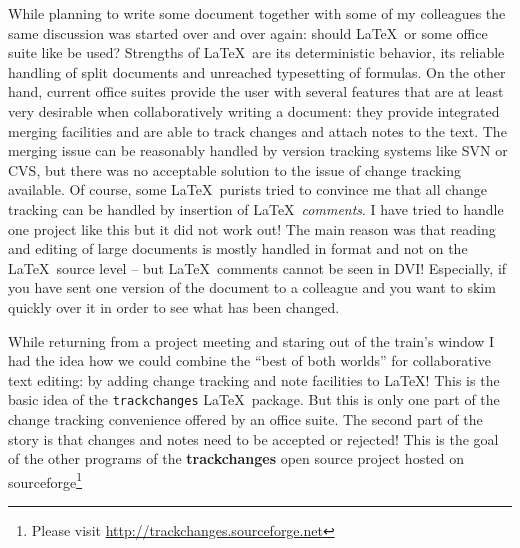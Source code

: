 \documentclass[a4paper,10pt]{article}
\begin{document}
While planning to write some  document together with some of my colleagues the same discussion was started over and over again: should \LaTeX\ or some office suite like  be used? Strengths of \LaTeX\ are its deterministic behavior, its reliable handling of split documents and unreached typesetting of formulas. On the other hand, current office suites provide the user with several features that are at least very desirable when collaboratively writing a document: they provide integrated merging facilities and are able to track changes and attach notes to the text. The merging issue can be reasonably handled by version tracking systems like SVN or CVS, but there was no acceptable solution to the issue of change tracking available. Of course, some  \LaTeX\ purists tried to convince me that all change tracking can be handled by insertion of \LaTeX\ \textit{comments}. I have tried to handle one project like this but it did not work out! The main reason was that reading and editing of large documents is mostly handled in  format and not on the \LaTeX\ source level -- but \LaTeX\ comments cannot be seen in DVI! Especially, if you have sent one version of the document to a colleague and you want to skim quickly over it in order to see what has been changed.

While returning from a project meeting and staring out of the train's window I had the idea how we could combine the ``best of both worlds'' for collaborative text editing: by adding change tracking and note facilities to \LaTeX ! This is the basic idea of the \texttt{trackchanges} \LaTeX\ package. But this is only one part of the change tracking convenience offered by an office suite. The second part of the story is that changes and notes need to be accepted or rejected! This is the goal of the other programs of the \textbf{trackchanges} open source project hosted on sourceforge\footnote{Please visit  \url{http://trackchanges.sourceforge.net}}
\end{document}
